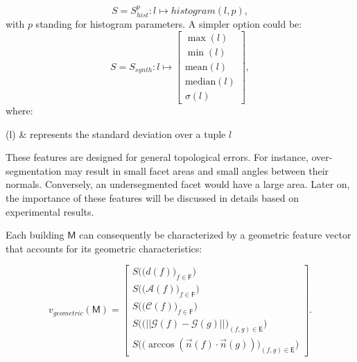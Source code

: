         \begin{equation}
            \label{eq::histogram_extractor}
        	S = S^p_{hist}: l \mapsto histogram(l, p),
        \end{equation}
        with $p$ standing for histogram parameters. A simpler option could be:
        \begin{equation}
            \label{eq::statistical_extractor}
            S = S_{synth}: l \mapsto \begin{bmatrix}
                \max(l)\\
                \min(l)\\
                \text{mean}(l)\\
                \text{median}(l)\\
                \sigma(l)
            \end{bmatrix},
        \end{equation}
        where:
        \begin{conditions}
            \sigma(l) & represents the standard deviation over a tuple $l$
        \end{conditions}

        These features are designed for general topological errors.
        For instance, over-segmentation may result in small facet areas and small angles between their normals.
        Conversely, an undersegmented facet would have a large area.
        Later on, the importance of these features will be discussed in details based on experimental results.
        
        Each building $\mathsf{M}$ can consequently be characterized by a geometric feature vector that accounts for its geometric characteristics:

        \begin{equation}
        	\label{eq::geometric_features}
            v_{geometric}(\mathsf{M}) = \begin{bmatrix}
            	S \Big(\big(d(f)\big)_{f \in \mathsf{F}}\Big)\\
                S \Big(\big(\mathscr{A}(f)\big)_{f \in \mathsf{F}}\Big)\\
                S \Big(\big(\mathscr{C}(f)\big)_{f \in \mathsf{F}}\Big)\\
                S \Big(\big( \vert\vert \mathscr{G}(f) - \mathscr{G}(g) \vert\vert \big)_{(f,g) \in \mathsf{E}}\Big)\\
                S\Big(\big( \arccos(\vec{n}(f) \cdot \vec{n}(g)) \big)_{(f,g) \in \mathsf{E}}\Big)
            \end{bmatrix}.
        \end{equation}

